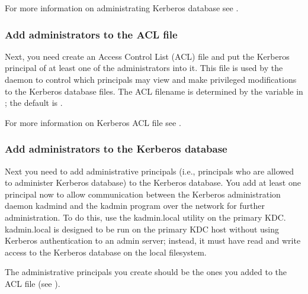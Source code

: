 \documentclass[letterpaper,10pt,english]{sphinxmanual}
\begin{document}
For more information on administrating Kerberos database see
{\hyperref[\detokenize{admin/database:db-operations}]{}}.


\subsubsection{Add administrators to the ACL file}
\label{\detokenize{admin/install_kdc:add-administrators-to-the-acl-file}}\label{\detokenize{admin/install_kdc:admin-acl}}
Next, you need create an Access Control List (ACL) file and put the
Kerberos principal of at least one of the administrators into it.
This file is used by the {\hyperref[\detokenize{admin/admin_commands/kadmind:kadmind-8}]{}} daemon to control which
principals may view and make privileged modifications to the Kerberos
database files.  The ACL filename is determined by the 
variable in {\hyperref[\detokenize{admin/conf_files/kdc_conf:kdc-conf-5}]{}}; the default is {\hyperref[\detokenize{mitK5defaults:paths}]{}}.

For more information on Kerberos ACL file see {\hyperref[\detokenize{admin/conf_files/kadm5_acl:kadm5-acl-5}]{}}.


\subsubsection{Add administrators to the Kerberos database}
\label{\detokenize{admin/install_kdc:add-administrators-to-the-kerberos-database}}\label{\detokenize{admin/install_kdc:addadmin-kdb}}
Next you need to add administrative principals (i.e., principals who
are allowed to administer Kerberos database) to the Kerberos database.
You  add at least one principal now to allow communication
between the Kerberos administration daemon kadmind and the kadmin
program over the network for further administration.  To do this, use
the kadmin.local utility on the primary KDC.  kadmin.local is designed
to be run on the primary KDC host without using Kerberos
authentication to an admin server; instead, it must have read and
write access to the Kerberos database on the local filesystem.

The administrative principals you create should be the ones you added
to the ACL file (see {\hyperref[\detokenize{admin/install_kdc:admin-acl}]{}}).
\end{document}
